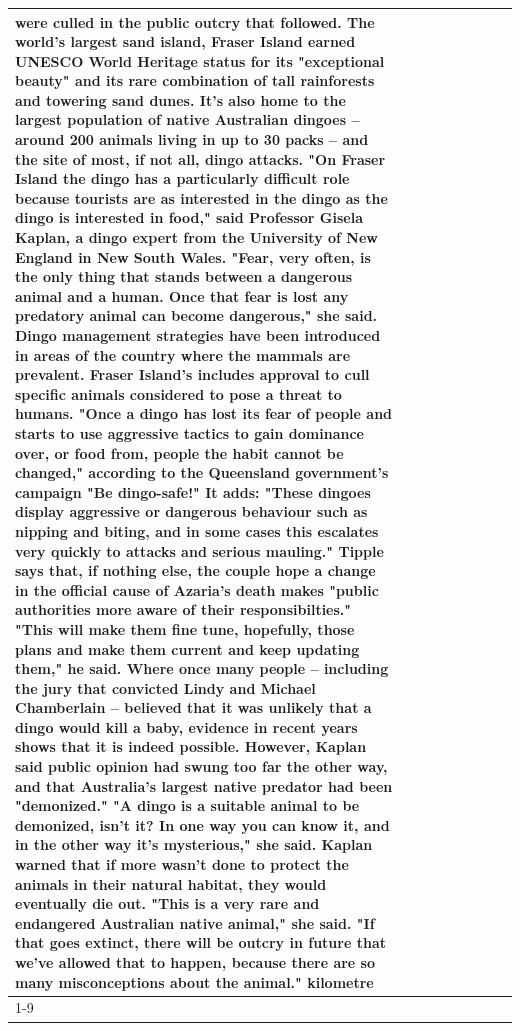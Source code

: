\begin{table}[H]
\begin{tabular}{lllrlllll}
were culled in the public outcry that followed. The world's largest sand island, Fraser Island earned UNESCO World Heritage status for its "exceptional beauty" and its rare combination of tall rainforests and towering sand dunes. It's also home to the largest population of native Australian dingoes -- around 200 animals living in up to 30 packs -- and the site of most, if not all, dingo attacks. "On Fraser Island the dingo has a particularly difficult role because tourists are as interested in the dingo as the dingo is interested in food," said Professor Gisela Kaplan, a dingo expert from the University of New England in New South Wales. "Fear, very often, is the only thing that stands between a dangerous animal and a human. Once that fear is lost any predatory animal can become dangerous," she said. Dingo management strategies have been introduced in areas of the country where the mammals are prevalent. Fraser Island's includes approval to cull specific animals considered to pose a threat to humans. "Once a dingo has lost its fear of people and starts to use aggressive tactics to gain dominance over, or food from, people the habit cannot be changed," according to the Queensland government's campaign "Be dingo-safe!" It adds: "These dingoes display aggressive or dangerous behaviour such as nipping and biting, and in some cases this escalates very quickly to attacks and serious mauling." Tipple says that, if nothing else, the couple hope a change in the official cause of Azaria's death makes "public authorities more aware of their responsibilties." "This will make them fine tune, hopefully, those plans and make them current and keep updating them," he said. Where once many people -- including the jury that convicted Lindy and Michael Chamberlain -- believed that it was unlikely that a dingo would kill a baby, evidence in recent years shows that it is indeed possible. However, Kaplan said public opinion had swung too far the other way, and that Australia's largest native predator had been "demonized." "A dingo is a suitable animal to be demonized, isn't it? In one way you can know it, and in the other way it's mysterious," she said. Kaplan warned that if more wasn't done to protect the animals in their natural habitat, they would eventually die out. "This is a very rare and endangered Australian native animal," she said. "If that goes extinct, there will be outcry in future that we've allowed that to happen, because there are so many misconceptions about the animal." kilometre \\
\cline{1-9}

\end{tabular}
\end{table}
